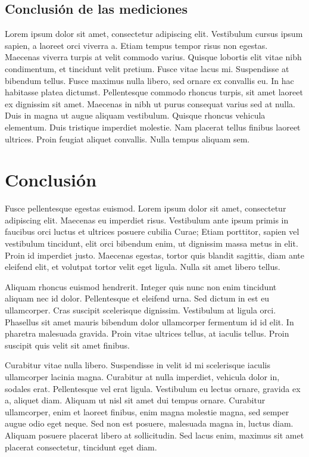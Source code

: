 \documentclass[final,narroweqnarray,inline]{ieee}
\begin{document}
  \subsection{Conclusión de las mediciones}

Lorem ipsum dolor sit amet, consectetur adipiscing elit. Vestibulum cursus ipsum sapien, a laoreet orci viverra a. Etiam tempus tempor risus non egestas. Maecenas viverra turpis at velit commodo varius. Quisque lobortis elit vitae nibh condimentum, et tincidunt velit pretium. Fusce vitae lacus mi. Suspendisse at bibendum tellus. Fusce maximus nulla libero, sed ornare ex convallis eu. In hac habitasse platea dictumst. Pellentesque commodo rhoncus turpis, sit amet laoreet ex dignissim sit amet. Maecenas in nibh ut purus consequat varius sed at nulla. Duis in magna ut augue aliquam vestibulum. Quisque rhoncus vehicula elementum. Duis tristique imperdiet molestie. Nam placerat tellus finibus laoreet ultrices. Proin feugiat aliquet convallis. Nulla tempus aliquam sem.

\section{Conclusión}

Fusce pellentesque egestas euismod. Lorem ipsum dolor sit amet, consectetur adipiscing elit. Maecenas eu imperdiet risus. Vestibulum ante ipsum primis in faucibus orci luctus et ultrices posuere cubilia Curae; Etiam porttitor, sapien vel vestibulum tincidunt, elit orci bibendum enim, ut dignissim massa metus in elit. Proin id imperdiet justo. Maecenas egestas, tortor quis blandit sagittis, diam ante eleifend elit, et volutpat tortor velit eget ligula. Nulla sit amet libero tellus.

Aliquam rhoncus euismod hendrerit. Integer quis nunc non enim tincidunt aliquam nec id dolor. Pellentesque et eleifend urna. Sed dictum in est eu ullamcorper. Cras suscipit scelerisque dignissim. Vestibulum at ligula orci. Phasellus sit amet mauris bibendum dolor ullamcorper fermentum id id elit. In pharetra malesuada gravida. Proin vitae ultrices tellus, at iaculis tellus. Proin suscipit quis velit sit amet finibus.

Curabitur vitae nulla libero. Suspendisse in velit id mi scelerisque iaculis ullamcorper lacinia magna. Curabitur at nulla imperdiet, vehicula dolor in, sodales erat. Pellentesque vel erat ligula. Vestibulum eu lectus ornare, gravida ex a, aliquet diam. Aliquam ut nisl sit amet dui tempus ornare. Curabitur ullamcorper, enim et laoreet finibus, enim magna molestie magna, sed semper augue odio eget neque. Sed non est posuere, malesuada magna in, luctus diam. Aliquam posuere placerat libero at sollicitudin. Sed lacus enim, maximus sit amet placerat consectetur, tincidunt eget diam.
\end{document}
